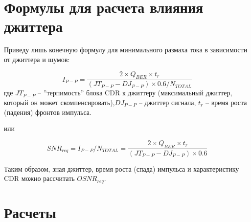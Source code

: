 \documentclass{article}
\begin{document}
\section{Формулы для расчета влияния джиттера}

Приведу лишь конечную формулу для минимального размаха тока в зависимости от джиттера и шумов:

\begin{equation}
    I_{P-P}=\frac{2\times Q_{BER}\times t_r}{(JT_{P-P}-DJ_{P-P})\times0.6/N_{TOTAL}}
\end{equation}
где $JT_{P-P}$ -- ''терпимость'' блока CDR к джиттеру (максимальный джиттер, который он может скомпенсировать),$DJ_{P-P}$ -- джиттер сигнала, $t_r$ -- время роста (падения) фронтов импульса.

или

\begin{equation}
    SNR_{req}=I_{P-P}/N_{TOTAL}=\frac{2\times Q_{BER}\times t_r}{(JT_{P-P}-DJ_{P-P})\times0.6}
\end{equation}

Таким образом, зная джиттер, время роста (спада) импульса и характеристику CDR можно рассчитать $OSNR_{req}$.

\section{Расчеты}
\end{document}
